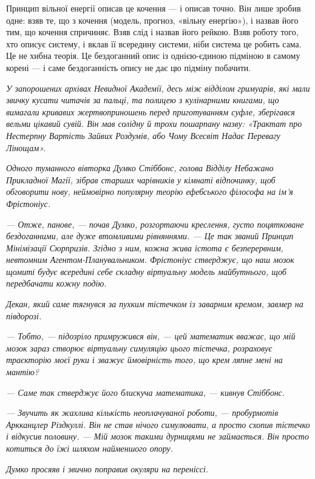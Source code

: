 \documentclass[12pt, a4paper, openany]{book}
\begin{document}
Принцип вільної енергії описав це кочення --- і описав точно. Він лише зробив одне: взяв те, що з кочення (модель, прогноз, «вільну енергію»), і назвав його тим, що кочення спричиняє. Взяв слід і назвав його рейкою. Взяв роботу того, хто описує систему, і вклав її всередину системи, ніби система це робить сама. Це не хибна теорія. Це бездоганний опис із однією-єдиною підміною в самому корені --- і саме бездоганність опису не дає цю підміну побачити.

\begin{terrybox}
\textit{У запорошених архівах Невидної Академії, десь між відділом гримуарів, які мали звичку кусати читачів за пальці, та полицею з кулінарними книгами, що вимагали кривавих жертвоприношень перед приготуванням суфле, зберігався вельми цікавий сувій. Він мав солідну й трохи пошарпану назву: «Трактат про Нестерпну Вартість Зайвих Роздумів, або Чому Всесвіт Надає Перевагу Лінощам».}

\textit{Одного туманного вівторка Думко Стіббонс, голова Відділу Небажано Прикладної Магії, зібрав старших чарівників у кімнаті відпочинку, щоб обговорити нову, неймовірно популярну теорію ефебського філософа на ім'я Фрістоніус.}

\textit{--- Отже, панове, --- почав Думко, розгортаючи креслення, густо поцятковане бездоганними, але дуже втомливими рівняннями. --- Це так званий Принцип Мінімізації Сюрпризів. Згідно з ним, кожна жива істота є безперервним, невтомним Агентом-Планувальником. Фрістоніус стверджує, що наш мозок щомиті будує всередині себе складну віртуальну модель майбутнього, щоб передбачати кожну подію.}

\textit{Декан, який саме тягнувся за пухким тістечком із заварним кремом, завмер на півдорозі.}

\textit{--- Тобто, --- підозріло примружився він, --- цей математик вважає, що мій мозок зараз створює віртуальну симуляцію цього тістечка, розраховує траєкторію моєї руки і зважує ймовірність того, що крем ляпне мені на мантію?}

\textit{--- Саме так стверджує його блискуча математика, --- кивнув Стіббонс.}

\textit{--- Звучить як жахлива кількість неоплачуваної роботи, --- пробурмотів Аркканцлер Різдкуллі. Він не став нічого симулювати, а просто схопив тістечко і відкусив половину. --- Мій мозок такими дурницями не займається. Він просто котиться до їжі шляхом найменшого опору.}

\textit{Думко просяяв і звично поправив окуляри на переніссі.}


\end{terrybox}
\end{document}

